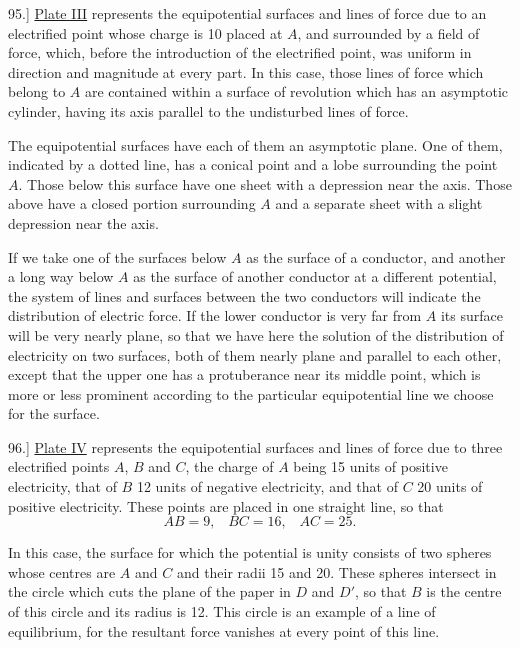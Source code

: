 \documentclass[12pt,oneside]{book}[2021/10/04]
\newcommand{\article}[1]{\phantomsection \label{art:#1}{#1.]}}
\newcommand{\¬}{\hphantom{0}}
\begin{document}
\article{95} \hyperref[plate:3]{Plate III} represents the equipotential surfaces and lines
of force due to an electrified point whose charge is 10 placed at
\(A\), and surrounded by a field of force, which, before the introduction
of the electrified point, was uniform in direction and
magnitude at every part. In this case, those lines of force which
belong to \(A\) are contained within a surface of revolution which
has an asymptotic cylinder, having its axis parallel to the undisturbed
lines of force.

The equipotential surfaces have each of them an asymptotic
plane. One of them, indicated by a dotted line, has a conical
point and a lobe surrounding the point \(A\). Those below this surface
have one sheet with a depression near the axis. Those above have
a closed portion surrounding \(A\) and a separate sheet with a slight
depression near the axis.

If we take one of the surfaces below \(A\) as the surface of a conductor,
and another a long way below \(A\) as the surface of another
conductor at a different potential, the system of lines and surfaces
between the two conductors will indicate the distribution of electric
force. If the lower conductor is very far from \(A\) its surface will
be very nearly plane, so that we have here the solution of the
distribution of electricity on two surfaces, both of them nearly
plane and parallel to each other, except that the upper one has
a protuberance near its middle point, which is more or less prominent
according to the particular equipotential line we choose for
the surface.

\article{96} \hyperref[plate:4]{Plate IV} represents the equipotential surfaces and lines
of force due to three electrified points \(A\), \(B\) and \(C\), the charge of \(A\)
being 15 units of positive electricity, that of \(B\) 12 units of negative
electricity, and that of \(C\) 20 units of positive electricity. These
points are placed in one straight line, so that
\[
AB=9\text{,} \quad BC=16\text{,} \quad AC=25\text{.}
\]

In this case, the surface for which the potential is unity consists
of two spheres whose centres are \(A\) and \(C\) and their radii 15 and 20.
These spheres intersect in the circle which cuts the plane of the
paper in \(D\) and \(D'\), so that \(B\) is the centre of this circle and its
radius is 12. This circle is an example of a line of equilibrium, for
the resultant force vanishes at every point of this line.
\end{document}
